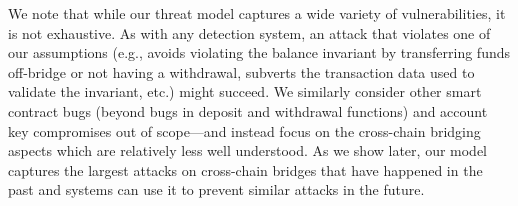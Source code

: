 We note that while our threat model captures a wide variety of vulnerabilities,
it is not exhaustive.  As with any detection system, an attack that violates one
of our assumptions (e.g., avoids violating the balance invariant by transferring
funds off-bridge or not having a withdrawal, subverts the transaction data used to validate the invariant,
etc.) might succeed.  
We similarly consider other smart contract bugs (beyond bugs in deposit and withdrawal functions) and account key compromises out of scope---and instead focus
on the cross-chain bridging aspects which are relatively less well understood.
As we show later, our model captures the largest attacks on
cross-chain bridges that have happened in the past and systems can use
it to prevent similar attacks in the future.


